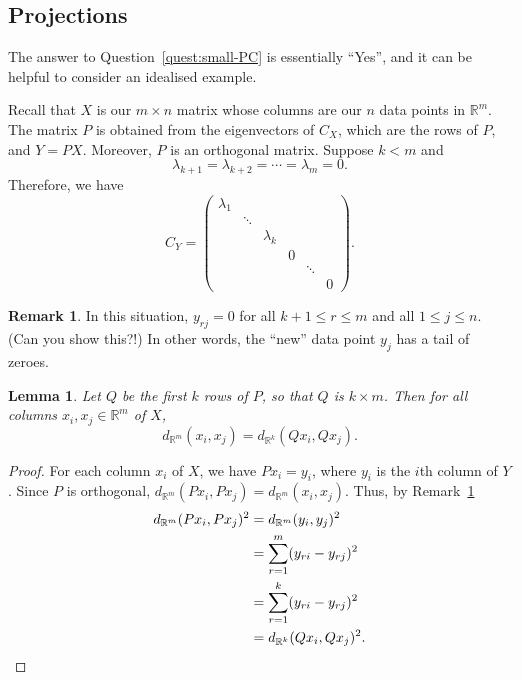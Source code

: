 \documentclass[a4paper, 12pt]{article}
\numberwithin{equation}{section}
\numberwithin{figure}{section}
\newtheorem{lem}[thm]{Lemma}
\theoremstyle{definition}
\newtheorem{remark}[thm]{Remark}
\renewcommand{\leq}{\leqslant}
\newcommand{\R}{\mathbb{R}}
\begin{document}
\subsection{Projections}

The answer to Question~\ref{quest:small-PC} is essentially ``Yes'', and it can be
helpful to consider an idealised example. 

Recall that $X$ is our $m\times n$ matrix whose columns are our $n$ data points
in $\R^m$. The matrix $P$ is obtained from the eigenvectors of $C_X$, which are
the rows of $P$, and $Y=PX$. Moreover, $P$ is an orthogonal matrix. Suppose $k <
m$ and 
\[ 
	\lambda_{k+1} = \lambda_{k+2} = \cdots = \lambda_m = 0. 
\]
Therefore, we have 
\[ 
	C_Y = \begin{pmatrix} 
		\lambda_1 & & & & & \\
		& \ddots & & & \\
		& & \lambda_k & & & \\
		& & & 0 & & \\
		& & & & \ddots & \\
		& & & & & 0
	\end{pmatrix} .
\] 

\begin{remark}\label{rem:tail-zeroes}
	In this situation, $y_{rj}=0$ for all $k+1 \leq r \leq m$ and all $1\leq j
	\leq n$. (Can you show this?!) In other words, the ``new'' data point $y_j$
	has a tail of zeroes. 
\end{remark}

\begin{lem}\label{lem:projection}
	Let $Q$ be the first $k$ rows of $P$, so that $Q$ is $k\times m$. Then for
	all columns $x_i,x_j\in\R^m$ of $X$, 
	\[ 
		d_{\R^m}(x_i, x_j) = d_{\R^k}(Qx_i, Qx_j).
	\] 
\end{lem}

\begin{proof} 
	For each column $x_i$ of $X$, we have $Px_i = y_i$, where $y_i$ is the $i$th
	column of $Y$. Since $P$ is orthogonal, $d_{\R^m}(Px_i, Px_j)= d_{\R^m}(x_i,
	x_j)$. Thus, by Remark~\ref{rem:tail-zeroes}
	\begin{align*}
		d_{\R^m}(Px_i, Px_j)^2 &= d_{\R^m}(y_i, y_j)^2 \\
		&= \sum_{r=1}^m (y_{ri} - y_{rj})^2 \\
		&= \sum_{r=1}^k (y_{ri} - y_{rj})^2 \\ 
		&= d_{\R^k}(Qx_i, Qx_j)^2. \qedhere
	\end{align*}
\end{proof}
\end{document}
